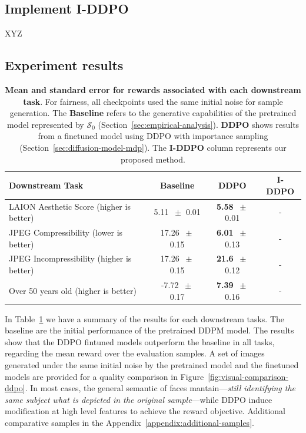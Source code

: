 \subsection{Implement I-DDPO}

XYZ

\subsection{Experiment results}
\begin{table}
\centering
\begin{tabular}{lccc}
\toprule
\textbf{Downstream Task} & \textbf{Baseline} & \textbf{DDPO} & \textbf{I-DDPO}\\
\midrule
LAION Aesthetic Score (higher is better) & 5.11 $~\pm$ 0.01 & \textbf{5.58} $~\pm$ 0.01 & - \\
JPEG Compressibility (lower is better) & 17.26 $~\pm$  0.15 & \textbf{6.01} $~\pm$ 0.13  & -\\
JPEG Incompressibility (higher is better) & 17.26 $~\pm$ 0.15 & \textbf{21.6} $~\pm$ 0.12 & - \\
Over 50 years old (higher is better) & -7.72 $~\pm$ 0.17 & \textbf{7.39} $~\pm$ 0.16& - \\
\bottomrule
\end{tabular}
\captionsetup{width=\textwidth} %
\caption{\textbf{Mean and standard error for rewards associated with each downstream task}. For fairness, all checkpoints used the same initial noise for sample generation. The \textbf{Baseline} refers to the generative capabilities of the pretrained model represented by $\mathcal{S}_{0}$ (Section~\ref{sec:empirical-analysis}). \textbf{DDPO} shows results from a finetuned model using DDPO with importance sampling (Section~\ref{sec:diffusion-model-mdp}). The \textbf{I-DDPO} column represents our proposed method.}
\label{tab:reward-results}
\end{table}

In Table~\ref{tab:reward-results} we have a summary of the results for each downstream tasks. The baseline are the initial performance of the pretrained DDPM model. The results show that the DDPO fintuned models outperform the baseline in all tasks, regarding the mean reward over the evaluation samples. A set of images generated under the same initial noise by the pretrained model and the finetuned models are provided for a quality comparison in Figure~\ref{fig:visual-comparison-ddpo}. In most cases, the general semantic of faces mantain---\textit{still identifying the same subject what
is depicted in the original sample}---while DDPO induce modification at high level features to achieve the reward objective. Additional comparative samples in the Appendix~\ref{appendix:additional-samples}. \\

